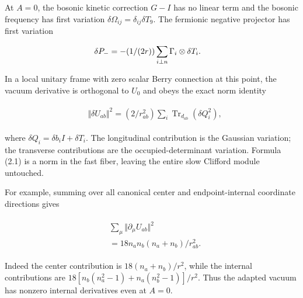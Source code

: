 At \(A=0\), the bosonic kinetic correction \(G-I\) has no linear term
and the bosonic frequency has first variation
\(\delta  \Omega _{ij}=\delta _{ij} \delta  T_{9}\). The fermionic
negative projector has first variation

\begin{gather*}
\begin{aligned}
& \delta  P_{-} = -(1/(2r)) \sum _{i \perp  n} \Gamma _{i} \otimes  \delta  T_{i}.
\end{aligned}\notag
\end{gather*}

In a local unitary frame with zero scalar Berry connection at this
point, the vacuum derivative is orthogonal to \(U_{0}\) and obeys the
exact norm identity

\begin{gather*}
\begin{aligned}
& \Vert \delta  U_{ab}\Vert ^{2} = (2/r_{ab}^{2}) \sum _{i} \operatorname{Tr} _{d_{ab}}(\delta  Q_{i}^{2}),
\end{aligned}\tag{2.1}
\end{gather*}

where \(\delta  Q_{i}=\delta  b_{i} I+\delta  T_{i}\). The longitudinal
contribution is the Gaussian variation; the transverse contributions are
the occupied-determinant variation. Formula (2.1) is a norm in the fast
fiber, leaving the entire slow Clifford module untouched.

For example, summing over all canonical center and endpoint-internal
coordinate directions gives

\begin{gather*}
\begin{aligned}
& \sum _{\mu} \Vert \partial _{\mu} U_{ab}\Vert ^{2} \\
& = 18 n_{a} n_{b} (n_{a}+n_{b}) / r_{ab}^{2}.
\end{aligned}\tag{2.2}
\end{gather*}

Indeed the center contribution is \(18(n_{a}+n_{b})/r^{2}\), while the
internal contributions are
\(18[n_{b}(n_{a}^{2}-1)+n_{a}(n_{b}^{2}-1)]/r^{2}\). Thus the adapted
vacuum has nonzero internal derivatives even at \(A=0\).

